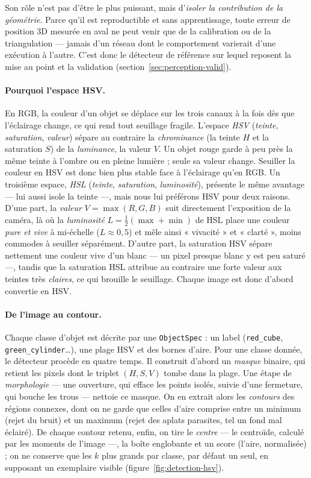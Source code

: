 Son rôle n'est pas d'être le plus puissant, mais d'\emph{isoler la contribution de la géométrie}. Parce qu'il est reproductible et sans apprentissage, toute erreur de position 3D mesurée en aval ne peut venir que de la calibration ou de la triangulation --- jamais d'un réseau dont le comportement varierait d'une exécution à l'autre. C'est donc le détecteur de référence sur lequel reposent la mise au point et la validation (section~\ref{sec:perception-valid}).

\paragraph{Pourquoi l'espace HSV.} En RGB, la couleur d'un objet se déplace sur les trois canaux à la fois dès que l'éclairage change, ce qui rend tout seuillage fragile. L'espace \emph{HSV} (\emph{teinte}, \emph{saturation}, \emph{valeur}) sépare au contraire la \emph{chrominance} (la teinte $H$ et la saturation $S$) de la \emph{luminance}, la valeur $V$. Un objet rouge garde à peu près la même teinte à l'ombre ou en pleine lumière ; seule sa valeur change. Seuiller la couleur en HSV est donc bien plus stable face à l'éclairage qu'en RGB. Un troisième espace, \emph{HSL} (\emph{teinte}, \emph{saturation}, \emph{luminosité}), présente le même avantage --- lui aussi isole la teinte ---, mais nous lui préférons HSV pour deux raisons. D'une part, la \emph{valeur} $V = \max(R,G,B)$ suit directement l'exposition de la caméra, là où la \emph{luminosité} $L = \tfrac{1}{2}(\max + \min)$ de HSL place une couleur \emph{pure et vive} à mi-échelle ($L \approx 0{,}5$) et mêle ainsi « vivacité » et « clarté », moins commodes à seuiller séparément. D'autre part, la saturation HSV sépare nettement une couleur vive d'un blanc --- un pixel presque blanc y est peu saturé ---, tandis que la saturation HSL attribue au contraire une forte valeur aux teintes très \emph{claires}, ce qui brouille le seuillage. Chaque image est donc d'abord convertie en HSV.

\paragraph{De l'image au contour.} Chaque classe d'objet est décrite par une \texttt{ObjectSpec} : un label (\texttt{red\_cube}, \texttt{green\_cylinder}\dots), une plage HSV et des bornes d'aire. Pour une classe donnée, le détecteur procède en quatre temps. Il construit d'abord un \emph{masque} binaire, qui retient les pixels dont le triplet $(H,S,V)$ tombe dans la plage. Une étape de \emph{morphologie} --- une ouverture, qui efface les points isolés, suivie d'une fermeture, qui bouche les trous --- nettoie ce masque. On en extrait alors les \emph{contours} des régions connexes, dont on ne garde que celles d'aire comprise entre un minimum (rejet du bruit) et un maximum (rejet des aplats parasites, tel un fond mal éclairé). De chaque contour retenu, enfin, on tire le \emph{centre} --- le centroïde, calculé par les moments de l'image ---, la boîte englobante et un score (l'aire, normalisée) ; on ne conserve que les $k$ plus grands par classe, par défaut un seul, en supposant un exemplaire visible (figure~\ref{fig:detection-hsv}).

